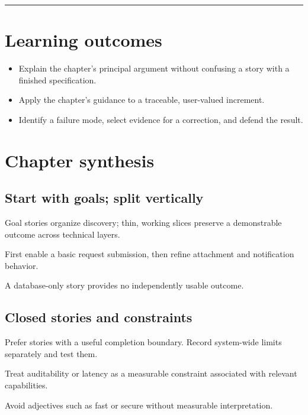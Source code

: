 \documentclass[11pt,letterpaper]{article}
\begin{document}
\tableofcontents\medskip\noindent\rule{\linewidth}{0.4pt}\medskip
\section{Learning outcomes}
\begin{itemize}[leftmargin=*,itemsep=2pt]
\item Explain the chapter's principal argument without confusing a story with a finished specification.
\item Apply the chapter's guidance to a traceable, user-valued increment.
\item Identify a failure mode, select evidence for a correction, and defend the result.
\end{itemize}
\section{Chapter synthesis}
\subsection{Start with goals; split vertically}
Goal stories organize discovery; thin, working slices preserve a demonstrable outcome across technical layers.

\begin{tcolorbox}[colback=tealback,colframe=navy,title={Engineering translation},breakable]
First enable a basic request submission, then refine attachment and notification behavior.

\end{tcolorbox}
\begin{tcolorbox}[colback=amberback,colframe=navy,title={Failure mode to watch},breakable]
A database-only story provides no independently usable outcome.

\end{tcolorbox}
\subsection{Closed stories and constraints}
Prefer stories with a useful completion boundary. Record system-wide limits separately and test them.

\begin{tcolorbox}[colback=tealback,colframe=navy,title={Engineering translation},breakable]
Treat auditability or latency as a measurable constraint associated with relevant capabilities.

\end{tcolorbox}
\begin{tcolorbox}[colback=amberback,colframe=navy,title={Failure mode to watch},breakable]
Avoid adjectives such as fast or secure without measurable interpretation.

\end{tcolorbox}
\end{document}
